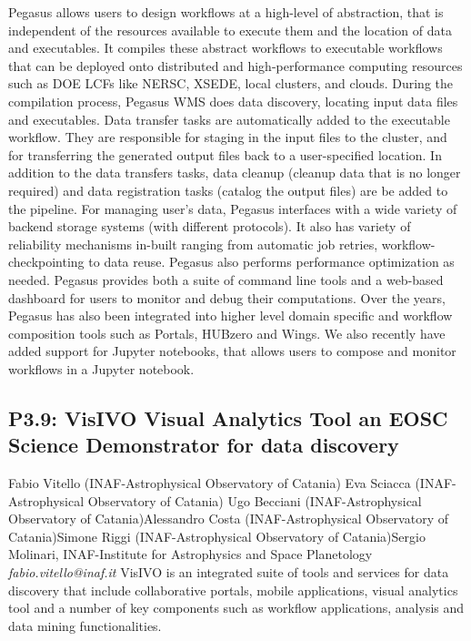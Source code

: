 \documentclass{report}
\begin{document}
Pegasus allows users to design workflows at a high-level of abstraction, that is independent
of the resources available to execute them and the location of data and executables. It
compiles these abstract workflows to executable workflows that can be deployed onto
distributed and high-performance computing resources such as DOE LCFs like NERSC,
XSEDE, local clusters, and clouds. During the compilation process, Pegasus WMS does
data discovery, locating input data files and executables. Data transfer tasks are
automatically added to the executable workflow. They are responsible for staging in the input
files to the cluster, and for transferring the generated output files back to a user-specified
location. In addition to the data transfers tasks, data cleanup (cleanup data that is no longer
required) and data registration tasks (catalog the output files) are be added to the pipeline.
For managing user’s data, Pegasus interfaces with a wide variety of backend storage
systems (with different protocols). It also has variety of reliability mechanisms in-built ranging
from automatic job retries, workflow-checkpointing to data reuse. Pegasus also performs
performance optimization as needed. Pegasus provides both a suite of command line tools
and a web-based dashboard for users to monitor and debug their computations. Over the
years, Pegasus has also been integrated into higher level domain specific and workflow
composition tools such as Portals, HUBzero and Wings. We also recently have added
support for Jupyter notebooks, that allows users to compose and monitor workflows in a
Jupyter notebook.\newline
\newpage
\subsection*{P3.9: VisIVO Visual Analytics Tool an EOSC Science Demonstrator for data discovery}
\bigskip
Fabio Vitello (INAF-Astrophysical Observatory of Catania) \newline Eva Sciacca (INAF-Astrophysical Observatory of Catania) \newline  Ugo Becciani (INAF-Astrophysical Observatory of Catania)\newline  Alessandro Costa (INAF-Astrophysical Observatory of Catania)\newline Simone Riggi (INAF-Astrophysical Observatory of Catania)\newline  Sergio Molinari, INAF-Institute for Astrophysics and Space Planetology\newline\newline
{\it fabio.vitello@inaf.it}\newline
\newline\newline
VisIVO is an integrated suite of tools and services for data discovery that include collaborative portals, mobile applications, visual analytics tool and a number of key components such as workflow applications, analysis and data mining functionalities.
\end{document}
